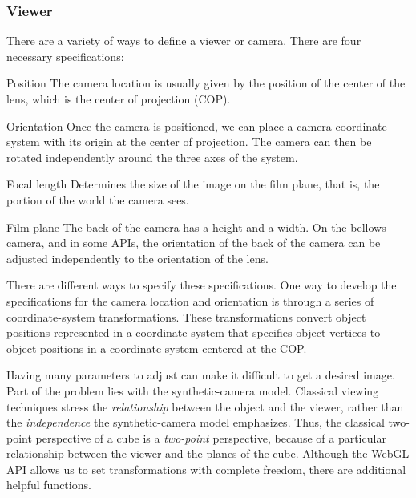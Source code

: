 \documentclass[\main/notes.tex]{subfiles}
\begin{document}
				\pagebreak

				\subsubsection{Viewer}
					There are a variety of ways to define a viewer or camera.
					There are four necessary specifications:
					\begin{indentparagraph}
						\begin{descriptenum}[nosep]
							\item[Position] The camera location is usually given by the position of 
								the center of the lens, which is the center of projection (COP).
							\item[Orientation] Once the camera is positioned,
								we can place a camera coordinate system
								with its origin at the center of projection.
								The camera can then be rotated independently around the three axes of the system.
							\item[Focal length] Determines the size of the image on the film plane,
								that is, the portion of the world the camera sees.
							\item[Film plane] The back of the camera has a height and a width.
								On the bellows camera, and in some APIs, the orientation of the back of the camera
								can be adjusted independently to the orientation of the lens.
						\end{descriptenum}
					\end{indentparagraph}

					There are different ways to specify these specifications.
					One way to develop the specifications for the camera location and orientation
					is through a series of coordinate-system transformations.
					These transformations convert object positions
					represented in a coordinate system that specifies object vertices
					to object positions in a coordinate system centered at the COP.

					Having many parameters to adjust can make it difficult to get a desired image.
					Part of the problem lies with the synthetic-camera model.
					Classical viewing techniques stress the
					\emph{relationship} between the object and the viewer,
					rather than the \emph{independence} the synthetic-camera model emphasizes.
					Thus, the classical two-point perspective of a cube is a \emph{two-point} perspective,
					because of a particular relationship between the viewer and the planes of the cube.
					Although the WebGL API allows us to set transformations with complete freedom,
					there are additional helpful functions.
\end{document}
